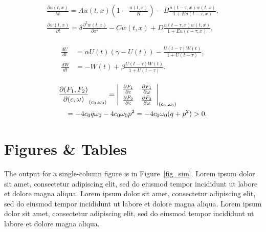 \documentclass[
  journal=large,
  manuscript=propuesta,
  year=2020,
  volume=37,
]{cup-journal}
\begin{document}
\begin{equation}
\begin{aligned}\label{eq:first}
\frac{\partial u(t,x)}{\partial t} = Au(t,x) \left(1-\frac{u(t,x)}{K}\right)
 -B\frac{u(t-\tau,x) w(t,x)}{1+Eu(t-\tau,x)},\\
\frac{\partial w(t,x)}{\partial t} =\delta \frac{\partial^2w(t,x)}{\partial x^2}-Cw(t,x)
+D\frac{u(t-\tau,x)w(t,x)}{1+Eu(t-\tau,x)},
\end{aligned}
\end{equation}

\begin{align}\label{eq:another}
\begin{split}
\frac{dU}{dt} &=\alpha U(t)(\gamma -U(t))-\frac{U(t-\tau)W(t)}{1+U(t-\tau)},\\
\frac{dW}{dt} &=-W(t)+\beta\frac{U(t-\tau)W(t)}{1+U(t-\tau)}.
\end{split}
\end{align}


\begin{align*}
&\frac{\partial(F_1,F_2)}{\partial(c,\omega)}_{(c_0,\omega_0)} = \left|
\begin{array}{ll}
\frac{\partial F_1}{\partial c} &\frac{\partial F_1}{\partial \omega} \\\noalign{\vskip3pt}
\frac{\partial F_2}{\partial c}&\frac{\partial F_2}{\partial \omega}
\end{array}\right|_{(c_0,\omega_0)}\\
&\quad=-4c_0q\omega_0 -4c_0\omega_0p^2 =-4c_0\omega_0(q+p^2)>0.
\end{align*}


\section{Figures \& Tables}

The output for a single-column figure is in Figure~\ref{fig_sim}.  Lorem ipsum dolor sit amet, consectetur adipiscing elit, sed do eiusmod tempor incididunt ut labore et dolore magna aliqua. Lorem ipsum dolor sit amet, consectetur adipiscing elit, sed do eiusmod tempor incididunt ut labore et dolore magna aliqua. Lorem ipsum dolor sit amet, consectetur adipiscing elit, sed do eiusmod tempor incididunt ut labore et dolore magna aliqua.

\end{document}
